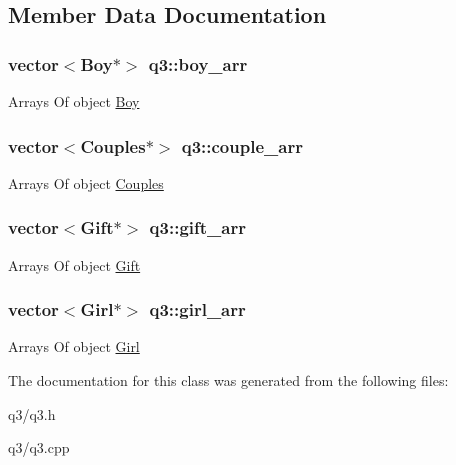 \subsection{Member Data Documentation}
\hypertarget{classq3_a8777605f4ffe28fdaa49ed9f30d592aa}{
\subsubsection[{boy\-\_\-arr}]{\setlength{\rightskip}{0pt plus 5cm}vector$<${\bf Boy}$\ast$$>$ q3\-::boy\-\_\-arr}}\label{classq3_a8777605f4ffe28fdaa49ed9f30d592aa}
Arrays Of object \hyperlink{class_boy}{Boy} \hypertarget{classq3_aadf1329133d035c0a85596c933709e38}{
\subsubsection[{couple\-\_\-arr}]{\setlength{\rightskip}{0pt plus 5cm}vector$<${\bf Couples}$\ast$$>$ q3\-::couple\-\_\-arr}}\label{classq3_aadf1329133d035c0a85596c933709e38}
Arrays Of object \hyperlink{class_couples}{Couples} \hypertarget{classq3_ac035b4da06e9de4a968f6d176f45907b}{
\subsubsection[{gift\-\_\-arr}]{\setlength{\rightskip}{0pt plus 5cm}vector$<${\bf Gift}$\ast$$>$ q3\-::gift\-\_\-arr}}\label{classq3_ac035b4da06e9de4a968f6d176f45907b}
Arrays Of object \hyperlink{class_gift}{Gift} \hypertarget{classq3_a50c1557e8343425fd55ed50e69437343}{
\subsubsection[{girl\-\_\-arr}]{\setlength{\rightskip}{0pt plus 5cm}vector$<${\bf Girl}$\ast$$>$ q3\-::girl\-\_\-arr}}\label{classq3_a50c1557e8343425fd55ed50e69437343}
Arrays Of object \hyperlink{class_girl}{Girl} 

The documentation for this class was generated from the following files\-:\begin{DoxyCompactItemize}
\item 
q3/q3.\-h\item 
q3/q3.\-cpp\end{DoxyCompactItemize}
